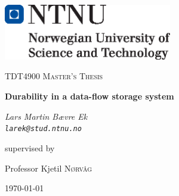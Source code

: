 \documentclass[b5paper]{report}
\begin{document}
\begin{titlepage}
  \centering
	\includegraphics[width=0.55\textwidth]{ntnu}\par\vspace{1cm}
	{\scshape\Large TDT4900 Master's Thesis \par}
	\vspace{1.5cm}
	{\huge\bfseries Durability in a data-flow storage system\par}
	\vspace{2cm}
	{\Large\itshape Lars Martin Bævre Ek \\ \texttt{larek@stud.ntnu.no} \par}
	\vfill
	supervised by\par
  Professor Kjetil \textsc{Nørvåg}

	{\large \today\par}
\end{titlepage}



\begin{abstract}
  
\end{abstract}

\tableofcontents

\ChTitleVar{\Huge\bfseries\rm}
\ChRuleWidth{1pt}

\pagestyle{fancy}










\appendix


\printbibliography
\end{document}
